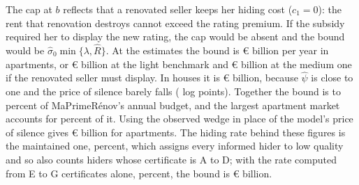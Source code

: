 The cap at $b$ reflects that a renovated seller keeps her hiding cost ($c_1=0$): the rent that renovation destroys cannot exceed the rating premium. If the subsidy required her to display the new rating, the cap would be absent and the bound would be $\hat\sigma_0\min\{\lambda,\hat R\}$. At the estimates the bound is \euro{}\attSavingUbTwoFiftyApt{} billion per year in apartments, or \euro{}\attSavingUbDTwoFiftyApt{} billion at the light benchmark and \euro{}\attSavingUbDFiveHundredApt{} billion at the medium one if the renovated seller must display. In houses it is \euro{}\attSavingUbTwoFiftyHouse{} billion, because $\hat\psi$ is close to one and the price of silence barely falls (\attSalienceHouse{} log points). Together the bound is \attSavingUbTotTwoFiftyLo{} to \attSavingUbTotTwoFiftyHi{} percent of MaPrimeR\'enov's annual budget, and the largest apartment market accounts for \attSavingTopShareApt{} percent of it. Using the observed wedge in place of the model's price of silence gives \euro{}\attSavingUbObsTwoFiftyApt{} billion for apartments. The hiding rate behind these figures is the maintained one, \attSigmaObsApt{} percent, which assigns every informed hider to low quality and so also counts hiders whose certificate is A to D; with the rate computed from E to G certificates alone, \attSigmaRegMeanApt{} percent, the bound is \euro{}\attSavingUbRegTwoFiftyApt{} billion.
